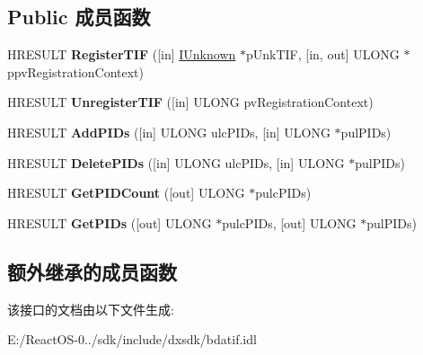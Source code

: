 \subsection*{Public 成员函数}
\begin{DoxyCompactItemize}
\item 
\mbox{\label{interface_i_m_p_e_g2___t_i_f___c_o_n_t_r_o_l_a6a1d4c7eb45720c8e3add8497f0e4597}} 
H\+R\+E\+S\+U\+LT {\bfseries Register\+T\+IF} (\mbox{[}in\mbox{]} \hyperlink{interface_i_unknown}{I\+Unknown} $\ast$p\+Unk\+T\+IF, \mbox{[}in, out\mbox{]} U\+L\+O\+NG $\ast$ppv\+Registration\+Context)
\item 
\mbox{\label{interface_i_m_p_e_g2___t_i_f___c_o_n_t_r_o_l_af92fd53240c50121dc01def123205d4e}} 
H\+R\+E\+S\+U\+LT {\bfseries Unregister\+T\+IF} (\mbox{[}in\mbox{]} U\+L\+O\+NG pv\+Registration\+Context)
\item 
\mbox{\label{interface_i_m_p_e_g2___t_i_f___c_o_n_t_r_o_l_a39c1eb236fdc278185c0eb1d1f327d8a}} 
H\+R\+E\+S\+U\+LT {\bfseries Add\+P\+I\+Ds} (\mbox{[}in\mbox{]} U\+L\+O\+NG ulc\+P\+I\+Ds, \mbox{[}in\mbox{]} U\+L\+O\+NG $\ast$pul\+P\+I\+Ds)
\item 
\mbox{\label{interface_i_m_p_e_g2___t_i_f___c_o_n_t_r_o_l_ae4469b839da9bcdac7ac88ea8d1e5814}} 
H\+R\+E\+S\+U\+LT {\bfseries Delete\+P\+I\+Ds} (\mbox{[}in\mbox{]} U\+L\+O\+NG ulc\+P\+I\+Ds, \mbox{[}in\mbox{]} U\+L\+O\+NG $\ast$pul\+P\+I\+Ds)
\item 
\mbox{\label{interface_i_m_p_e_g2___t_i_f___c_o_n_t_r_o_l_a82aedad02a9b20ebb6f93e0550c2203f}} 
H\+R\+E\+S\+U\+LT {\bfseries Get\+P\+I\+D\+Count} (\mbox{[}out\mbox{]} U\+L\+O\+NG $\ast$pulc\+P\+I\+Ds)
\item 
\mbox{\label{interface_i_m_p_e_g2___t_i_f___c_o_n_t_r_o_l_a8e8ee34b655bdcbbd05e0ad888d0dff3}} 
H\+R\+E\+S\+U\+LT {\bfseries Get\+P\+I\+Ds} (\mbox{[}out\mbox{]} U\+L\+O\+NG $\ast$pulc\+P\+I\+Ds, \mbox{[}out\mbox{]} U\+L\+O\+NG $\ast$pul\+P\+I\+Ds)
\end{DoxyCompactItemize}
\subsection*{额外继承的成员函数}


该接口的文档由以下文件生成\+:\begin{DoxyCompactItemize}
\item 
E\+:/\+React\+O\+S-\/0../sdk/include/dxsdk/bdatif.\+idl\end{DoxyCompactItemize}
